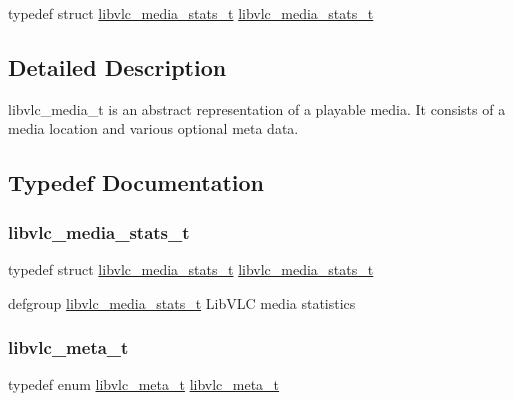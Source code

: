 \begin{DoxyCompactItemize}
\item 
typedef struct \hyperlink{structlibvlc__media__stats__t}{libvlc\+\_\+media\+\_\+stats\+\_\+t} \hyperlink{group__libvlc__media_ga7fc3997423872bc339619d3d14a31724}{libvlc\+\_\+media\+\_\+stats\+\_\+t}
\end{DoxyCompactItemize}


\subsection{Detailed Description}
libvlc\+\_\+media\+\_\+t is an abstract representation of a playable media. It consists of a media location and various optional meta data. 

\subsection{Typedef Documentation}
\mbox{\label{group__libvlc__media_ga7fc3997423872bc339619d3d14a31724}} 
\subsubsection{\texorpdfstring{libvlc\+\_\+media\+\_\+stats\+\_\+t}{libvlc\_media\_stats\_t}}
{\footnotesize\ttfamily typedef struct \hyperlink{structlibvlc__media__stats__t}{libvlc\+\_\+media\+\_\+stats\+\_\+t}  \hyperlink{structlibvlc__media__stats__t}{libvlc\+\_\+media\+\_\+stats\+\_\+t}}

defgroup \hyperlink{structlibvlc__media__stats__t}{libvlc\+\_\+media\+\_\+stats\+\_\+t} Lib\+V\+LC media statistics \mbox{\label{group__libvlc__media_gada00e7231546f7af82a8e3f7bda01994}} 
\subsubsection{\texorpdfstring{libvlc\+\_\+meta\+\_\+t}{libvlc\_meta\_t}}
{\footnotesize\ttfamily typedef enum \hyperlink{group__libvlc__media_ga90e7814a020f87d4c443d8d09b6dd4a0}{libvlc\+\_\+meta\+\_\+t}  \hyperlink{group__libvlc__media_ga90e7814a020f87d4c443d8d09b6dd4a0}{libvlc\+\_\+meta\+\_\+t}}

